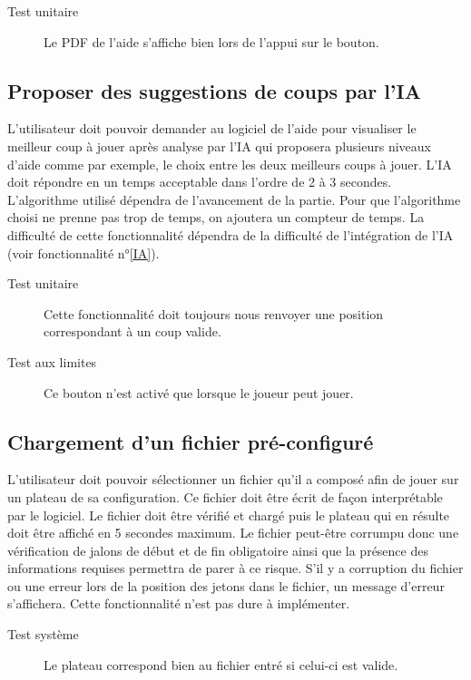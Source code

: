 \documentclass[a4paper,12pt]{article}
\begin{document}
\begin{description}
\item[Test unitaire] Le PDF de l’aide s’affiche bien lors de l’appui sur le bouton.
\end{description}

\subsection{Proposer des suggestions de coups par l'IA}

L’utilisateur doit pouvoir demander au logiciel de l’aide pour visualiser le meilleur coup à jouer après analyse par l’IA qui proposera plusieurs niveaux d'aide comme par exemple, le choix entre les deux meilleurs coups à jouer. L'IA doit répondre en un temps acceptable dans l'ordre de 2 à 3 secondes. L'algorithme utilisé dépendra de l'avancement de la partie. Pour que l'algorithme choisi ne prenne pas trop de temps, on ajoutera un compteur de temps. La difficulté de cette fonctionnalité dépendra de la difficulté de l'intégration de l'IA (voir fonctionnalité n°\ref{IA}).

\begin{description}
\item[Test unitaire] Cette fonctionnalité doit toujours nous renvoyer une position correspondant à un coup valide.
\item[Test aux limites] Ce bouton n'est activé que lorsque le joueur peut jouer.
\end{description}

\subsection{Chargement d’un fichier pré-configuré}

L’utilisateur doit pouvoir sélectionner un fichier qu’il a composé afin de jouer sur un plateau de sa configuration. Ce fichier doit être écrit de façon interprétable par le logiciel. Le fichier doit être vérifié et chargé puis le plateau qui en résulte doit être affiché en 5 secondes maximum. Le fichier peut-être corrumpu donc une vérification de jalons de début et de fin obligatoire ainsi que la présence des informations requises permettra de parer à ce risque. S'il y a corruption du fichier ou une erreur lors de la position des jetons dans le fichier, un message d'erreur s'affichera. Cette fonctionnalité n'est pas dure à implémenter.

\begin{description}
\item[Test système] Le plateau correspond bien au fichier entré si celui-ci est valide.
\end{description}
\end{document}
